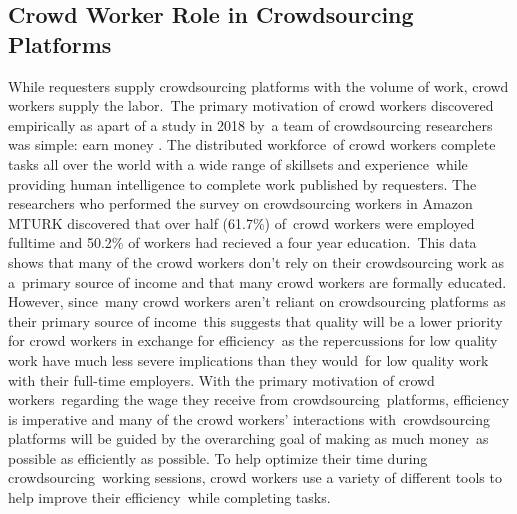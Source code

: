 \documentclass[letterpaper,12pt]{article}
\begin{document}
\subsection{Crowd Worker Role in Crowdsourcing Platforms}
While requesters supply crowdsourcing platforms with the volume of work, crowd workers supply the labor.\
The primary motivation of crowd workers discovered empirically as apart of a study in 2018 by\
a team of crowdsourcing researchers was simple: earn money \cite{Kaplan2018}. The distributed workforce\
of crowd workers complete tasks all over the world with a wide range of skillsets and experience\
while providing human intelligence to complete work published by requesters. The researchers
who performed the survey on crowdsourcing workers in Amazon MTURK discovered that over half (61.7\%) of\
crowd workers were employed fulltime and 50.2\% of workers had recieved a four year education.\cite{Kaplan2018}\
This data shows that many of the crowd workers don't rely on their crowdsourcing work as a\
primary source of income and that many crowd workers are formally educated. However, since\
many crowd workers aren't reliant on crowdsourcing platforms as their primary source of income\
this suggests that quality will be a lower priority for crowd workers in exchange for efficiency\
as the repercussions for low quality work have much less severe implications than they would\
for low quality work with their full-time employers. With the primary motivation of crowd workers\
regarding the wage they receive from crowdsourcing\
platforms, efficiency is imperative and many of the crowd workers' interactions with\
crowdsourcing platforms will be guided by the overarching goal of making as much money\
as possible as efficiently as possible. To help optimize their time during crowdsourcing\
working sessions, crowd workers use a variety of different tools to help improve their efficiency\
while completing tasks.

\end{document}
